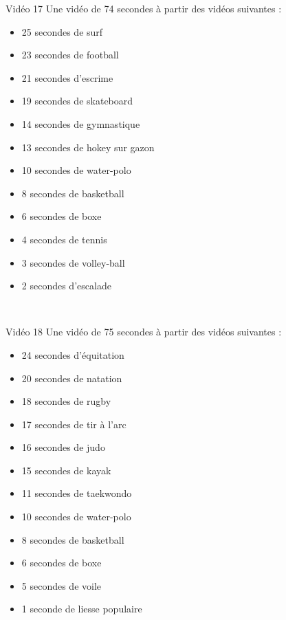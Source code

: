 \documentclass[10pt, a5paper,twoside]{article}
\begin{document}
\begin{card}[width = \textwidth, colback = olympicgreen, colframe = olympicgreen, bottomtitle = 2mm]{Vidéo 17}
  Une vidéo de 74 secondes à partir des vidéos suivantes :
  \vspace{-1mm}\begin{itemize}
    \item 25 secondes de surf
    \item 23 secondes de football
    \item 21 secondes d'escrime
    \item 19 secondes de skateboard
    \item 14 secondes de gymnastique
    \item 13 secondes de hokey sur gazon
    \item 10 secondes de water-polo
    \item 8 secondes de basketball
    \item 6 secondes de boxe
    \item 4 secondes de tennis
    \item 3 secondes de volley-ball
    \item 2 secondes d'escalade
  \end{itemize}
\end{card}

\vfill

\clearpage
~
\vfill

\begin{card}[width = \textwidth, colback = olympicgreen, colframe = olympicgreen, bottomtitle = 2mm]{Vidéo 18}
  Une vidéo de 75 secondes à partir des vidéos suivantes :
  \vspace{-1mm}\begin{itemize}
    \item 24 secondes d'équitation
    \item 20 secondes de natation
    \item 18 secondes de rugby
    \item 17 secondes de tir à l'arc
    \item 16 secondes de judo
    \item 15 secondes de kayak
    \item 11 secondes de taekwondo
    \item 10 secondes de water-polo
    \item 8 secondes de basketball
    \item 6 secondes de boxe
    \item 5 secondes de voile
    \item 1 seconde de liesse populaire
  \end{itemize}
\end{card}
\end{document}
